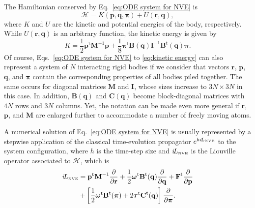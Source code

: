 \documentclass[
journal=jctcce,
layout=twocolumn
]{achemso}
\newcommand{\mt}[1]{\boldsymbol{\mathbf{#1}}}   %
\newcommand{\vt}[1]{\boldsymbol{\mathbf{#1}}}   %
\newcommand{\tr}[1]{#1^\text{t}}                %
\newcommand{\diff}[2]{\frac{\partial #1}{\partial #2}} %
\newcommand{\Ham}[1]{{\mathcal H}_\text{#1}}    %
\newcommand{\Liu}[1]{i\!L_\text{#1}}            %
\newcommand{\timestep}{h}
\begin{document}
The Hamiltonian conserved by Eq.~\eqref{eq:ODE system for NVE} is
\begin{equation}
\label{eq:Hamiltonian}
\Ham{} = K(\vt p, \vt q, \vt \pi) + U(\vt r,\vt q),
\end{equation}
where $K$ and $U$ are the kinetic and potential energies of the body, respectively.
While $U(\vt r, \vt q)$ is an arbitrary function, the kinetic energy is given by
\begin{equation}
\label{eq:kinetic energy}
K = \frac{1}{2} \tr{\vt p} {\mt M}^{-1} {\vt p} + \frac{1}{8} \tr{\vt \pi} {\mt B}(\vt q) {\mt I}^{-1} \tr{\mt B}(\vt q) {\vt \pi}.
\end{equation}
Of course, Eqs.~\eqref{eq:ODE system for NVE} to \eqref{eq:kinetic energy} can also represent a system of $N$ interacting rigid bodies if we consider that vectors $\vt r$, $\vt p$, $\vt q$, and $\vt \pi$ contain the corresponding properties of all bodies piled together.
The same occurs for diagonal matrices $\mt M$ and $\mt I$, whose sizes increase to $3N \times 3N$ in this case.
In addition, $\mt B(\vt q)$ and $\mt C(\vt q)$ become block-diagonal matrices with $4N$ rows and $3N$ columns.
Yet, the notation can be made even more general if $\vt r$, $\vt p$, and $\mt M$ are enlarged further to accommodate a number of freely moving atoms.

A numerical solution of Eq.~\eqref{eq:ODE system for NVE} is usually represented by a stepwise application of the classical time-evolution propagator \cite{Tuckerman_2010} $e^{\timestep \Liu{\tiny NVE}}$ to the system configuration, where $\timestep$ is the time-step size and $\Liu{\tiny NVE}$ is the Liouville operator associated to $\Ham{}$, which is
\begin{equation}
\label{eq:Lioville operator}
\begin{split}
\Liu{\tiny NVE} &= \tr{\vt p} {\mt M}^{-1} \diff{}{\vt r} + \frac{1}{2} \tr{\vt \omega} \tr{\mt B}(\vt q) \diff{}{\vt q} + \tr{\vt F} \diff{}{\vt p} \\
&+ \left[ \frac{1}{2} \tr{\vt \omega} \tr{\mt B}(\vt \pi) + 2 \tr{\vt \tau} \tr{\mt C}(\vt q) \right] \diff{}{\vt \pi}.
\end{split}
\end{equation}
\end{document}
